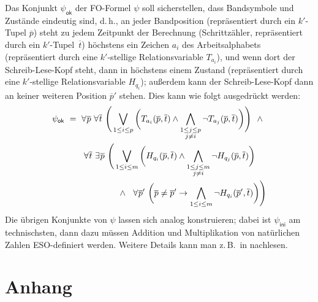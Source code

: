 \documentclass[fontsize=11pt, twoside=false, numbers=autoenddot]{scrbook}
\begin{document}
Das Konjunkt $\psi_{\textsf{ok}}$ der FO-Formel $\psi$ soll sicherstellen,
dass Bandsymbole und Zustände eindeutig sind, d.\,h.,
an jeder Bandposition (repräsentiert durch ein $k'$-Tupel $\overline{p}$)
steht zu jedem Zeitpunkt der Berechnung
(Schrittzähler, repräsentiert durch ein $k'$-Tupel~$\overline{t}$)
höchstens ein Zeichen $a_i$ des Arbeitsalphabets
(repräsentiert durch eine $k'$-stellige Relationsvariable $T_{a_i}$),
und wenn dort der Schreib-Lese-Kopf steht,
dann in höchstens einem Zustand
(repräsentiert durch eine $k'$-stellige Relationsvariable $H_{q_i}$);
außerdem kann der Schreib-Lese-Kopf dann an keiner weiteren Position $\overline{p}'$ stehen.
Dies kann wie folgt ausgedrückt werden:
%
\begin{align*}
  \psi_{\textsf{ok}} & ~=~
  \forall\:\! \overline{p}~\forall\:\! \overline{t}~
  \Bigg(
    \bigvee_{1 \leq i \leq p} \bigg(
      T_{a_i}(\overline{p},\overline{t}) \land
      \bigwedge_{\substack{1 \leq j \leq p\\j \neq i}} \lnot T_{a_j}(\overline{p},\overline{t})
    \bigg)
  \Bigg)
  ~~\land \\
  & \hspace*{8mm}
  \forall\:\! \overline{t}~\exists\:\! \overline{p}~
  \Bigg(
    \bigvee_{1 \leq i \leq m} \bigg(
      H_{q_i}(\overline{p},\overline{t}) \land
      \bigwedge_{\substack{1 \leq j \leq m\\j \neq i}} \lnot H_{q_j}(\overline{p},\overline{t})
    \bigg)
  \\
  & \hspace*{22mm}
  \land~~ \forall\:\! \overline{p}'~
  \bigg(
    \overline{p} \neq \overline{p}' \to
    \bigwedge_{1 \leq i \leq m} \lnot H_{q_i}(\overline{p}',\overline{t})
  \bigg)\Bigg)
\end{align*}
%
Die übrigen Konjunkte von $\psi$ lassen sich analog konstruieren;
dabei ist $\psi_{\textsf{ini}}$ am technischsten,
dann dazu müssen Addition und Multiplikation von natürlichen Zahlen
ESO-definiert werden.
Weitere Details kann man z.\,B.\ in \cite{EF99,Imm99} nachlesen.


\part*{Anhang}
\end{document}
